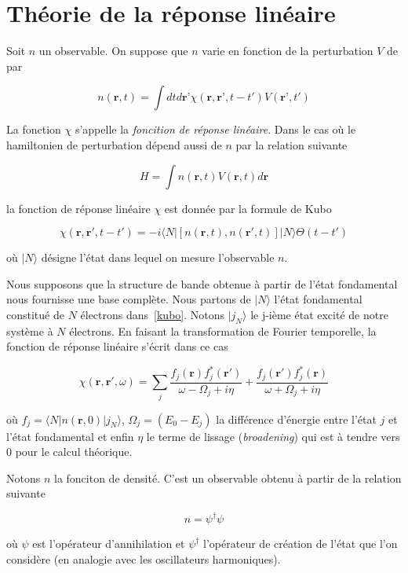 \chapter{Théorie de la réponse linéaire}\label{TRL}
Soit $n$ un observable. On suppose que $n$ varie en fonction de la perturbation $V$ de par

$$
n(\textbf{r}, t) = \int dt d\textbf{r'}  \chi (\textbf{r}, \textbf{r'}, t-t') V(\textbf{r'}, t')
$$

La fonction $\chi$ s'appelle la \textit{foncition de réponse linéaire}. Dans le cas où le hamiltonien de perturbation dépend aussi de $n$ par la relation suivante

$$
H = \int n(\textbf{r}, t) V(\textbf{r}, t) d\textbf{r}
$$

la fonction de réponse linéaire $\chi$ est donnée par la formule de Kubo~\cite{Abrikosov1963}

\begin{equation}\label{kubo}
  \chi (\textbf{r}, \textbf{r}', t-t') = -i \langle N | [n(\textbf{r}, t), n(\textbf{r}', t)] |N \rangle \Theta(t-t')
\end{equation}

où $|N \rangle $ désigne l'état dans lequel on mesure l'observable $n$.

Nous supposons que la structure de bande obtenue à partir de l'état fondamental nous fournisse une base complète. Nous partons de $|N \rangle$ l'état fondamental constitué de $N$ électrons dans~\ref{kubo}. Notons $| j_N \rangle $ le j-ième état excité de notre système à $N$ électrons. En faisant la transformation de Fourier temporelle, la fonction de réponse linéaire s'écrit dans ce cas

\begin{equation}
\chi (\textbf{r}, \textbf{r}', \omega) = \sum_j \frac{f_j(\textbf{r}) f_j^*(\textbf{r}') }{\omega - \Omega_j + i \eta} + \frac{f_j(\textbf{r}') f_j^*(\textbf{r}) }{\omega + \Omega_j + i \eta}
\end{equation}

où $f_j = \langle N | n(\textbf{r}, 0) | j_N \rangle$, $\Omega_j = (E_0 - E_j)$ la différence d'énergie entre l'état $j$ et l'état fondamental et enfin $\eta$ le terme de lissage (\textit{broadening}) qui est à tendre vers 0 pour le calcul théorique.

Notons $n$ la fonciton de densité. C'est un observable obtenu à partir de la relation suivante

$$
n = \psi^\dagger \psi
$$

où $\psi$ est l'opérateur d'annihilation et $\psi^\dagger$ l'opérateur de création de l'état que l'on considère (en analogie avec les oscillateurs harmoniques).

